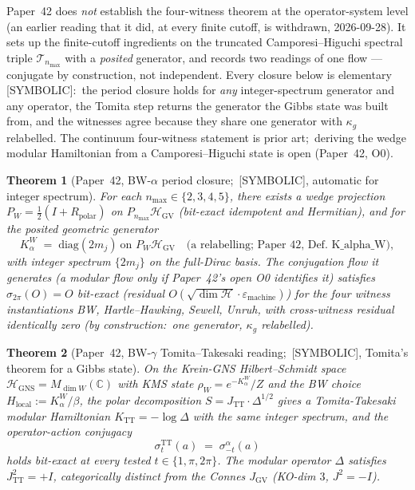 \documentclass[11pt,a4paper]{article}
\theoremstyle{plain}
\newtheorem{theorem}{Theorem}[section]
\theoremstyle{definition}
\newcommand{\nmax}{n_{\max}}
\newcommand{\Hilb}{\mathcal{H}}
\newcommand{\HGV}{\mathcal{H}_{\mathrm{GV}}}
\newcommand{\Tcal}{\mathcal{T}}
\newcommand{\C}{\mathbb{C}}
\begin{document}
Paper~42 \cite{paper42} does \emph{not} establish the four-witness
theorem at the operator-system level (an earlier reading that it did,
at every finite cutoff, is withdrawn, 2026-09-28).  It sets up the
finite-cutoff ingredients on the truncated Camporesi--Higuchi spectral
triple $\Tcal_{\nmax}$ with a \emph{posited} generator, and records
two readings of one flow --- conjugate by construction, not
independent.  Every closure below is elementary [SYMBOLIC]:\ the
period closure holds for \emph{any} integer-spectrum generator and any
operator, the Tomita step returns the generator the Gibbs state was
built from, and the witnesses agree because they share one generator
with $\kappa_g$ relabelled.  The continuum four-witness statement is
prior art;\ deriving the wedge modular Hamiltonian from a
Camporesi--Higuchi state is open (Paper~42, O0).

\begin{theorem}[Paper~42, BW-$\alpha$ period closure;\ {[SYMBOLIC]},
automatic for integer spectrum]
\label{thm:bw_alpha}
For each $\nmax \in \{2, 3, 4, 5\}$, there exists a wedge projection
$P_{W} = \tfrac{1}{2}(I + R_{\mathrm{polar}})$ on $P_{\nmax}\HGV$
(bit-exact idempotent and Hermitian), and for the posited geometric
generator
\begin{equation}
K_{\alpha}^{W} \;=\; \mathrm{diag}(2 m_{j}) \ \text{on } P_{W}\HGV
\quad \text{(a relabelling;\ Paper~42, Def.~K\_alpha\_W)},
\label{eq:k_alpha}
\end{equation}
with integer spectrum $\{2 m_{j}\}$ on the full-Dirac basis.
The conjugation flow it generates (a modular flow only if Paper~42's
open O0 identifies it) satisfies $\sigma_{2\pi}(O) = O$ bit-exact (residual
$O(\sqrt{\dim \Hilb} \cdot \varepsilon_{\mathrm{machine}})$) for the
four witness instantiations BW, Hartle--Hawking, Sewell, Unruh, with
cross-witness residual identically zero (by construction:\ one
generator, $\kappa_g$ relabelled).
\end{theorem}

\begin{theorem}[Paper~42, BW-$\gamma$ Tomita--Takesaki reading;\
{[SYMBOLIC]}, Tomita's theorem for a Gibbs state]
\label{thm:bw_gamma}
On the Krein-GNS Hilbert--Schmidt space
$\Hilb_{\mathrm{GNS}} = M_{\dim W}(\C)$ with KMS state
$\rho_{W} = e^{-K_{\alpha}^{W}}/Z$ and the BW choice $H_{\mathrm{local}}
:= K_{\alpha}^{W} / \beta$, the polar decomposition
$S = J_{\mathrm{TT}} \cdot \Delta^{1/2}$ gives a Tomita-Takesaki
modular Hamiltonian $K_{\mathrm{TT}} = -\log \Delta$ with the
same integer spectrum, and the operator-action conjugacy
\begin{equation}
\sigma_{t}^{\mathrm{TT}}(a) \;=\; \sigma_{-t}^{\alpha}(a)
\label{eq:bw_alpha_gamma_conjugacy}
\end{equation}
holds bit-exact at every tested $t \in \{1, \pi, 2\pi\}$.  The
modular operator $\Delta$ satisfies $J_{\mathrm{TT}}^{2} = +I$,
categorically distinct from the Connes $J_{\mathrm{GV}}$ (KO-dim $3$,
$J^{2} = -I$).
\end{theorem}
\end{document}

